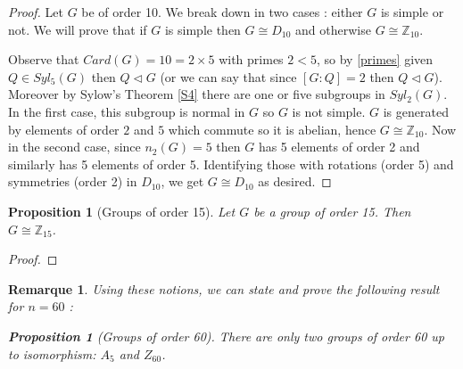 \documentclass{article}
\theoremstyle{definition}
\theoremstyle{plain}
\theoremstyle{plain}
\theoremstyle{plain}
\theoremstyle{plain}
\newtheorem{remark}[subsubsection]{Remarque}
\theoremstyle{definition}
\theoremstyle{plain}
\theoremstyle{plain}
\newtheorem{propeng}[subsubsection]{Proposition}
\begin{document}
\begin{proof}
	Let \( G \) be of order 10. We break down in two cases : either \( G \) is simple or not. We will prove that if \( G \) is simple then \( G \cong D_{10} \) and otherwise \( G \cong \mathbb{Z}_{10} \).

	Observe that \( Card(G) = 10 = 2 \times 5 \) with primes \( 2 < 5\), so by \cref{primes} given \( Q \in Syl_5(G) \) then \( Q \triangleleft G \) (or we can say that since \( [G:Q] = 2 \) then \( Q \triangleleft G \)).
	Moreover by Sylow's Theorem \ref{S4} there are one or five subgroups in \( Syl_2(G) \). In the first case, this subgroup is normal in \( G \) so \( G \) is not simple. \( G \) is generated by elements of order \( 2 \) and \( 5 \) which commute so it is abelian, hence \( G \cong \mathbb{Z}_{10} \). Now in the second case, since \( n_2(G) = 5 \) then \( G \) has 5 elements of order 2 and similarly has 5 elements of order 5. Identifying those with rotations (order 5) and symmetries (order 2) in \( D_{10} \), we get \( G \cong D_{10} \) as desired.
\end{proof} 

\begin{propeng}[Groups of order 15]
Let \( G \) be a group of order 15. Then \( G \cong \mathbb{Z}_{15} \).
\end{propeng}

\begin{proof}
	
\end{proof}

\begin{remark}
	Using these notions, we can state and prove the following result for \( n = 60 \) :
\begin{propeng}[Groups of order 60]
	There are only two groups of order 60 up to isomorphism: \( A_5 \) and \( Z_{60} \).
\end{propeng}

\end{remark}
\clearpage

\printbibliography
\end{document}
